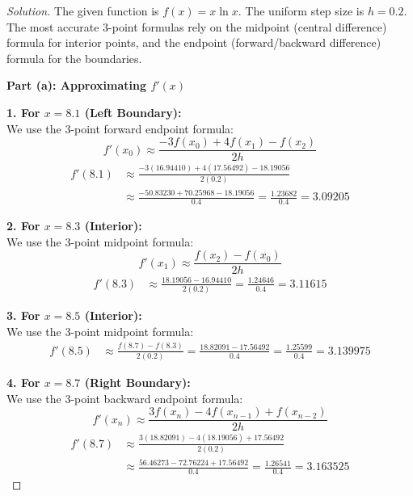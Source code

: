 \documentclass[11pt, a4paper]{article}
\newif\ifsolutionnewpage
\newenvironment{solution}
  {\begin{proof}[Solution]}
  {\end{proof}\ifsolutionnewpage\newpage\fi}
\begin{document}
    \begin{solution}
    The given function is $f(x) = x \ln x$. The uniform step size is $h = 0.2$. The most accurate 3-point formulas rely on the midpoint (central difference) formula for interior points, and the endpoint (forward/backward difference) formula for the boundaries.
    
    \vspace{0.3cm}
    \textbf{Part (a): Approximating $f'(x)$}
    
    \textbf{1. For $x = 8.1$ (Left Boundary):} \\
    We use the 3-point forward endpoint formula:
    \begin{equation*}
    f'(x_0) \approx \frac{-3f(x_0) + 4f(x_1) - f(x_2)}{2h}
    \end{equation*}
    \begin{align*}
    f'(8.1) &\approx \frac{-3(16.94410) + 4(17.56492) - 18.19056}{2(0.2)} \\
    &\approx \frac{-50.83230 + 70.25968 - 18.19056}{0.4} = \frac{1.23682}{0.4} = \mathbf{3.09205}
    \end{align*}
    
    \textbf{2. For $x = 8.3$ (Interior):} \\
    We use the 3-point midpoint formula:
    \begin{equation*}
    f'(x_1) \approx \frac{f(x_2) - f(x_0)}{2h}
    \end{equation*}
    \begin{align*}
    f'(8.3) &\approx \frac{18.19056 - 16.94410}{2(0.2)} = \frac{1.24646}{0.4} = \mathbf{3.11615}
    \end{align*}
    
    \textbf{3. For $x = 8.5$ (Interior):} \\
    We use the 3-point midpoint formula:
    \begin{align*}
    f'(8.5) &\approx \frac{f(8.7) - f(8.3)}{2(0.2)} = \frac{18.82091 - 17.56492}{0.4} = \frac{1.25599}{0.4} = \mathbf{3.139975}
    \end{align*}
    
    \textbf{4. For $x = 8.7$ (Right Boundary):} \\
    We use the 3-point backward endpoint formula:
    \begin{equation*}
    f'(x_n) \approx \frac{3f(x_n) - 4f(x_{n-1}) + f(x_{n-2})}{2h}
    \end{equation*}
    \begin{align*}
    f'(8.7) &\approx \frac{3(18.82091) - 4(18.19056) + 17.56492}{2(0.2)} \\
    &\approx \frac{56.46273 - 72.76224 + 17.56492}{0.4} = \frac{1.26541}{0.4} = \mathbf{3.163525}
    \end{align*}
    

\end{solution}
\end{document}
